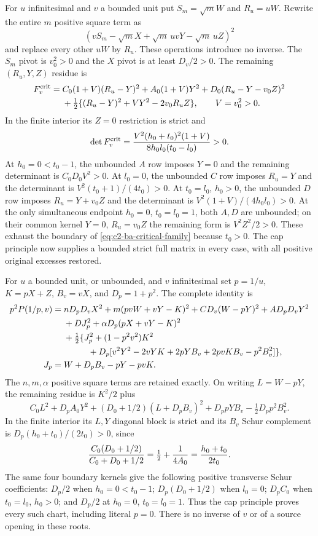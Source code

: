 For $u$ infinitesimal and $v$ a bounded unit put $S_m=\sqrt m W$ and
$R_u=uW$. Rewrite the entire $m$ positive square term as
\[
 (vS_m-\sqrt mX+\sqrt m\,uvY-\sqrt m\,uZ)^2
\]
and replace every other $uW$ by $R_u$. These operations introduce no
inverse. The $S_m$ pivot is $v_0^2>0$ and the $X$ pivot is at least
$D_v/2>0$. The remaining $(R_u,Y,Z)$ residue is
\begin{equation}
 \begin{split}
 F_v^{\rm crit}={}&C_0(1+V)(R_u-Y)^2+A_0(1+V)Y^2
 +D_0(R_u-Y-v_0Z)^2\\
 &+\tfrac12\{(R_u-Y)^2+VY^2-2v_0R_uZ\},\qquad V=v_0^2>0.
 \end{split}
 \label{eq:c2-ba-outer-v}
\end{equation}
In the finite interior its $Z=0$ restriction is strict and
\[
 \det F_v^{\rm crit}
 ={V^2(h_0+t_0)^2(1+V)\over8h_0l_0(t_0-l_0)}>0.
\]
At $h_0=0<t_0-1$, the unbounded $A$ row imposes $Y=0$ and the
remaining determinant is $C_0D_0V^2>0$. At $l_0=0$, the unbounded
$C$ row imposes $R_u=Y$ and the determinant is
$V^2(t_0+1)/(4t_0)>0$. At $t_0=l_0$, $h_0>0$, the unbounded $D$
row imposes $R_u=Y+v_0Z$ and the determinant is
$V^2(1+V)/(4h_0l_0)>0$. At the only simultaneous endpoint
$h_0=0$, $t_0=l_0=1$, both $A,D$ are unbounded; on their common
kernel $Y=0$, $R_u=v_0Z$ the remaining form is $V^2Z^2/2>0$.
These exhaust the boundary of \eqref{eq:c2-ba-critical-family} because
$t_0>0$. The cap principle now supplies a bounded strict full matrix
in every case, with all positive original excesses restored.

For $u$ a bounded unit, or unbounded, and $v$ infinitesimal set
$p=1/u$, $K=pX+Z$, $B_v=vX$, and $D_p=1+p^2$. The complete identity is
\begin{equation}
 \begin{split}
 p^2P(1/p,v)={}&nD_pD_vX^2+m(pvW+vY-K)^2
 +CD_v(W-pY)^2+AD_pD_vY^2\\
 &+D J_p^2+\alpha D_p(pX+vY-K)^2\\
 &+\tfrac12\{J_p^2+(1-p^2v^2)K^2\\
 &\hspace{10mm}+D_p[v^2Y^2-2vYK+2pYB_v+2pvKB_v-p^2B_v^2]\},\\
 J_p={}&W+D_pB_v-pY-pvK.
 \end{split}
 \label{eq:c2-ba-outer-u-full}
\end{equation}
The $n,m,\alpha$ positive square terms are retained exactly. On writing
$L=W-pY$, the remaining residue is $K^2/2$ plus
\begin{equation}
 C_0L^2+D_pA_0Y^2+(D_0+1/2)(L+D_pB_v)^2
 +D_ppYB_v-\tfrac12D_pp^2B_v^2.
 \label{eq:c2-ba-outer-u}
\end{equation}
In the finite interior its $L,Y$ diagonal block is strict and its
$B_v$ Schur complement is $D_p(h_0+t_0)/(2t_0)>0$, since
\[
 {C_0(D_0+1/2)\over C_0+D_0+1/2}
 =\tfrac12+{1\over4A_0}={h_0+t_0\over2t_0}.
\]
The same four boundary kernels give the following positive transverse
Schur coefficients: $D_p/2$ when $h_0=0<t_0-1$;
$D_p(D_0+1/2)$ when $l_0=0$;
$D_pC_0$ when $t_0=l_0$, $h_0>0$;
and $D_p/2$ at $h_0=0$, $t_0=l_0=1$.
Thus the cap principle proves every such chart, including literal $p=0$.
There is no inverse of $v$ or of a source opening in these roots.

